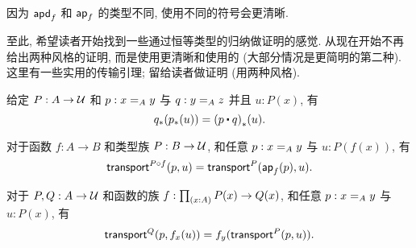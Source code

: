 因为 $\apdfunc{f}$ 和 $\apfunc{f}$ 的类型不同, 使用不同的符号会更清晰.

%

至此, 希望读者开始找到一些通过恒等类型的归纳做证明的感觉.
从现在开始不再给出两种风格的证明, 而是使用更清晰和使用的 (大部分情况是更简明的第二种).
这里有一些实用的传输引理; 留给读者做证明 (用两种风格).

\begin{lem}
    \label{thm:transport-concat}
    给定 $P:A\to\type$ 和 $p:\id[A]xy$ 与 $q:\id[A]yz$ 并且 $u:P(x)$, 有
    \[ \trans{q}{\trans{p}{u}} = \trans{(p\ct q)}{u}. \]
\end{lem}

\begin{lem}
    \label{thm:transport-compose}
    对于函数 $f:A\to B$ 和类型族 $P:B\to\type$, 和任意 $p:\id[A]xy$ 与 $u:P(f(x))$, 有
    \[ \transfib{P\circ f}{p}{u} = \transfib{P}{\apfunc f(p)}{u}. \]
\end{lem}

\begin{lem}
    \label{thm:ap-transport}
    对于 $P,Q:A\to \type$ 和函数的族 $f:\prd{x:A} P(x)\to Q(x)$, 和任意 $p:\id[A]xy$ 与 $u:P(x)$, 有
    \[ \transfib{Q}{p}{f_x(u)} = f_y(\transfib{P}{p}{u}). \]
\end{lem}

%
